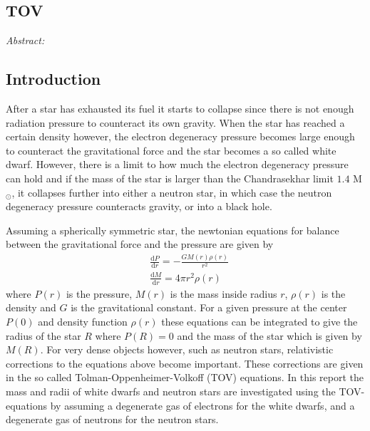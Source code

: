 \documentclass[twocolumn]{article}
\begin{document}
\begin{large}

\section*{TOV}
\begin{normalsize}
\textit{Abstract:} 
\end{normalsize}
\subsection*{Introduction}

After a star has exhausted its fuel it starts to collapse since there is not enough radiation pressure to counteract its own gravity. When the star has reached a certain density however, the electron degeneracy pressure becomes large enough to counteract the gravitational force and the star becomes a so called white dwarf. However, there is a limit to how much the electron degeneracy pressure can hold and if the mass of the star is larger than the Chandrasekhar limit $1.4$ M$_\odot$, it collapses further into either a neutron star, in which case the neutron degeneracy pressure counteracts gravity, or into a black hole. 

Assuming a spherically symmetric star, the newtonian equations for balance between the gravitational force and the pressure are given by
\begin{equation}
    \label{28maj1900}
    \begin{split}
        &\frac{\text{d}P}{\text{d}r} = -\frac{GM(r)\rho(r)}{r^2} \\ 
        &\frac{\text{d}M}{\text{d}r} = 4\pi r^2\rho(r)
    \end{split}
\end{equation}
where $P(r)$ is the pressure, $M(r)$ is the mass inside radius $r$, $\rho(r)$ is the density and $G$ is the gravitational constant. For a given pressure at the center $P(0)$ and density function $\rho(r)$ these equations can be integrated to give the radius of the star $R$ where $P(R)=0$ and the mass of the star which is given by $M(R)$. For very dense objects however, such as neutron stars, relativistic corrections to the equations above become important. These corrections are given in the so called Tolman-Oppenheimer-Volkoff (TOV) equations. In this report the mass and radii of white dwarfs and neutron stars are investigated using the TOV-equations by assuming a degenerate gas of electrons for the white dwarfs, and a degenerate gas of neutrons for the neutron stars.


\end{large}
\end{document}
